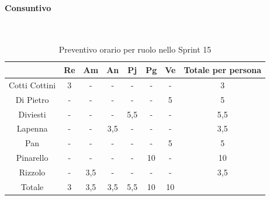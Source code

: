\documentclass{article}
\begin{document}
                \paragraph{Consuntivo}\mbox{}\\
                \begin{table}[H]
                    \centering
                    \begin{tabular}{|c|c|c|c|c|c|c|c|}
                    \hline
                                  & Re  & Am  & An  & Pj  & Pg  & Ve  & Totale per persona \\ \hline
                    Cotti Cottini & 3   & -   & -   & -   & -   & -   & 3                  \\ \hline
                    Di Pietro     & -   & -   & -   & -   & -   & 5   & 5                  \\ \hline
                    Diviesti      & -   & -   & -   & 5,5 & -   & -   & 5,5                \\ \hline
                    Lapenna       & -   & -   & 3,5 & -   & -   & -   & 3,5                \\ \hline
                    Pan           & -   & -   & -   & -   & -   & 5   & 5                  \\ \hline
                    Pinarello     & -   & -   & -   & -   & 10  & -   & 10                 \\ \hline
                    Rizzolo       & -   & 3,5 & -   & -   & -   & -   & 3,5                \\ \hline
                    Totale        & 3   & 3,5 & 3,5 & 5,5 & 10  & 10  &                    \\ \hline
                    \end{tabular}
                    \caption{Preventivo orario per ruolo nello Sprint 15}  
                \end{table}

\end{document}
